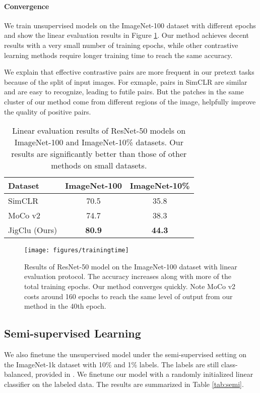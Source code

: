 \documentclass[final]{cvpr}
\begin{document}
\paragraph{Convergence}
We train unsupervised models on the ImageNet-100 dataset with different epochs and show the linear evaluation results in Figure \ref{fig:trainingtime}. Our method achieves decent results with a very small number of training epochs, while other contrastive learning methods require longer training time to reach the same accuracy. 

We explain that effective contrastive pairs are more frequent in our pretext tasks because of the split of input images. For exmaple, pairs in SimCLR are similar and are easy to recognize, leading to futile pairs. But the patches in the same cluster of our method come from different regions of the image, helpfully improve the quality of positive pairs.
 
\begin{table}
	\centering
	\begin{tabular}{l c c}
		\toprule
		Dataset & ImageNet-100 & ImageNet-10\%  \\
		\midrule
		SimCLR & 70.5 & 35.8 \\
		MoCo v2 & 74.7 & 38.3	 \\
		JigClu (Ours) & \textbf{80.9} & \textbf{44.3} \\
		\bottomrule
	\end{tabular}
	\vspace{0.1in}
	\caption{Linear evaluation results of ResNet-50 models on ImageNet-100 and ImageNet-10\% datasets. Our results are significantly better than those of other methods on small datasets.}
	\label{tab:linear2}
\end{table}

\begin{figure}
	\centering
	\texttt{[image: figures/trainingtime]}
	\caption{Results of ResNet-50 model on the ImageNet-100 dataset with linear evaluation protocol. The accuracy increases along with more of the total training epochs. Our method converges quickly. Note MoCo v2 costs around 160 epochs to reach the same level of output from our method in the 40th epoch.}
	\label{fig:trainingtime}
\end{figure}

\subsection{Semi-supervised Learning}
We also finetune the unsupervised model under the semi-supervised setting on the ImageNet-1k dataset with 10\% and 1\% labels. The labels are still class-balanced, provided in \cite{simclr}. We finetune our model with a randomly initialized linear classifier on the labeled data. The results are summarized in Table \ref{tab:semi}.
\end{document}
